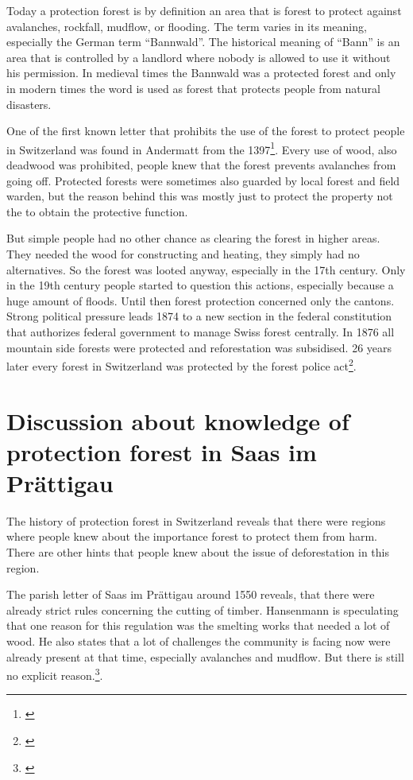 \documentclass[12pt, a4paper]{article}
\begin{document}
Today a protection forest is by definition an area that is forest to protect against avalanches, rockfall, mudflow, or flooding. The term varies in its meaning, especially the German term ``Bannwald''. The historical meaning of ``Bann'' is an area that is controlled by a landlord where nobody is allowed to use it without his permission. In medieval times the Bannwald was a protected forest and only in  modern times the word is used as forest that protects people from natural disasters.

One of the first known letter that prohibits the use of the forest to protect people in Switzerland was found in Andermatt from the 1397\footnote{\citet[p.~104]{pfister2002tag}}. Every use of wood, also deadwood was prohibited, people knew that the forest prevents avalanches from going off. Protected forests were sometimes also guarded by local forest and field warden, but the reason behind this was mostly just to protect the property not the to obtain the protective function. 

But simple people had no other chance as clearing the forest in higher areas. They needed the wood for constructing and heating, they simply had no alternatives. So the forest was looted anyway, especially in the 17th century. Only in the 19th century people started to question this actions, especially because a huge amount of floods. Until then forest protection concerned only the cantons. Strong political pressure leads 1874 to a new section in the federal constitution that authorizes federal government to manage Swiss forest centrally. In 1876 all mountain side forests were protected and reforestation was subsidised. 26 years later every forest in Switzerland was protected by the forest police act\footnote{\citet[p.~108]{pfister2002tag}}.

\section*{Discussion about knowledge of protection forest in Saas im Prättigau}
The history of protection forest in Switzerland reveals that there were regions where people knew about the importance forest to protect them from harm. There are other hints that people knew about the issue of deforestation in this region. 

The parish letter of Saas im Prättigau around 1550 reveals, that there were already strict rules concerning the cutting of timber. Hansenmann is speculating that one reason for this regulation was the smelting works that needed a lot of wood. He also states that a lot of challenges the community is facing now were already present at that time, especially avalanches and mudflow. But there is still no  explicit reason.\footnote{\citet[p.~27, 139]{hansemann1995saaser}}.
\end{document}
